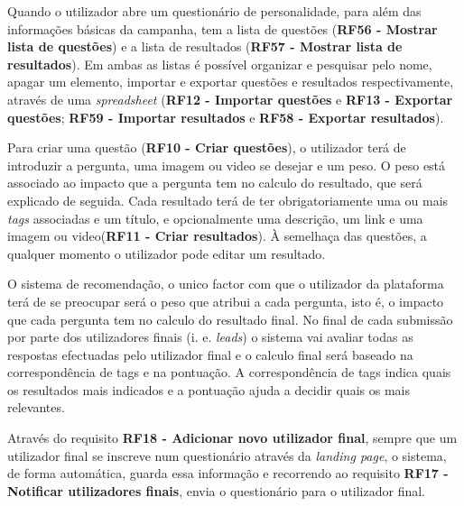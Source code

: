 Quando o utilizador abre um questionário de personalidade, para além das informações básicas da campanha, tem a lista de questões (\textbf{RF56 - Mostrar lista de questões}) e a lista de resultados (\textbf{RF57 - Mostrar lista de resultados}). Em ambas as listas é possível organizar e pesquisar pelo nome, apagar um elemento, importar e exportar questões e resultados respectivamente, através de uma \textit{spreadsheet} (\textbf{RF12 - Importar questões} e \textbf{RF13 - Exportar questões}; \textbf{RF59 - Importar resultados} e \textbf{RF58 - Exportar resultados}).

Para criar uma questão (\textbf{RF10 - Criar questões}), o utilizador terá de introduzir a pergunta, uma imagem ou video se desejar e um peso. O peso está associado ao impacto que a pergunta tem no calculo do resultado, que será explicado de seguida. 
Cada resultado terá de ter obrigatoriamente uma ou mais \textit{tags} associadas e um título, e opcionalmente uma descrição, um link e uma imagem ou video(\textbf{RF11 - Criar resultados}). À semelhaça das questões, a qualquer momento o utilizador pode editar um resultado.

O sistema de recomendação, o unico factor com que o utilizador da plataforma terá de se preocupar será o peso que atribui a cada pergunta, isto é, o impacto que cada pergunta tem no calculo do resultado final. No final de cada submissão por parte dos utilizadores finais (i. e. \textit{leads}) o sistema vai avaliar todas as respostas efectuadas pelo utilizador final e o calculo final será baseado na correspondência de tags e na pontuação. A correspondência de tags indica quais os resultados mais indicados e a pontuação ajuda a decidir quais os mais relevantes.

Através do requisito \textbf{RF18 - Adicionar novo utilizador final}, sempre que um utilizador final se inscreve num questionário através da \textit{landing page}, o sistema, de forma automática, guarda essa informação e recorrendo ao requisito \textbf{RF17 - Notificar utilizadores finais}, envia o questionário para o utilizador final.

\pagebreak


